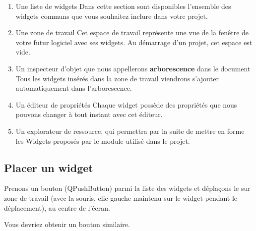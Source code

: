 \begin{enumerate}

    \item {\color{green}Une liste de widgets}
    Dans cette section sont disponibles l'ensemble des widgets communs que vous souhaitez inclure dans votre projet.

    \item {\color{blue}Une zone de travail}
    Cet espace de travail représente une vue de la fenêtre de votre futur logiciel avec ses widgets. \newline
    Au démarrage d'un projet, cet espace est vide.


    \item {\color{red}Un inspecteur d'objet que nous appellerons \textbf{arborescence} dans le document}
    Tous les widgets insérés dans la zone de travail viendrons s'ajouter automatiquement dans l'arborescence.

    
    \item {\color{magenta}Un éditeur de propriétés}
    Chaque widget possède des propriétés que nous pouvons changer à tout instant avec cet éditeur.

    \item {\color{gray}Un explorateur de ressource}, qui permettra par la suite de mettre en forme les Widgets proposés par le module  utilisé dans le projet.
    
\end{enumerate}


\subsection{Placer un widget}


Prenons un bouton (QPushButton) parmi la {\color{green}liste des widgets} et déplaçons le sur {\color{blue}zone de travail} (avec la souris, clic-gauche maintenu sur le widget pendant le déplacement), au centre de l'écran.




Vous devriez obtenir un bouton similaire. \newline


